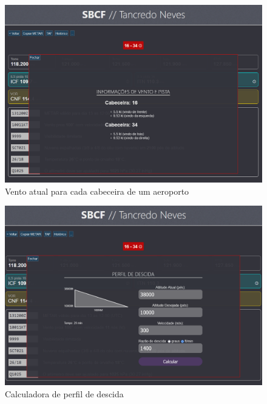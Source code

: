 \begin{figure}[H]
    \begin{center}
    \includegraphics[width=\linewidth]{img/wind-info.png}
    \caption{Vento atual para cada cabeceira de um aeroporto}
    \label{fig:wind-calc}
    \end{center}
\end{figure}

\begin{figure}[H]
    \begin{center}
    \includegraphics[width=\linewidth]{img/descent.png}
    \caption{Calculadora de perfil de descida}
    \label{fig:wind-calc}
    \end{center}
\end{figure}

